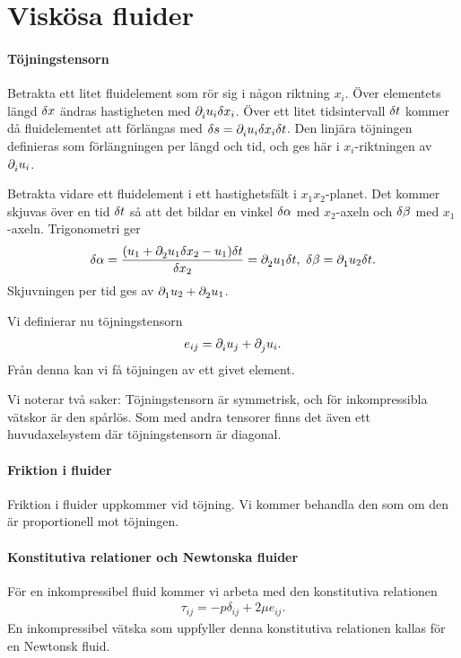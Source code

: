 \section{Viskösa fluider}

\paragraph{Töjningstensorn}
Betrakta ett litet fluidelement som rör sig i någon riktning $x_{i}$. Över elementets längd $\delta x$ ändras hastigheten med $\partial_{i}^{}u_{i}\delta x_{i}$. Över ett litet tidsintervall $\delta t$ kommer då fluidelementet att förlängas med $\delta s = \partial_{i}^{}u_{i}\delta x_{i}\delta t$. Den linjära töjningen definieras som förlängningen per längd och tid, och ges här i $x_{i}$-riktningen av $\partial_{i}^{}u_{i}$.

Betrakta vidare ett fluidelement i ett hastighetsfält i $x_{1}x_{2}$-planet. Det kommer skjuvas över en tid $\delta t$ så att det bildar en vinkel $\delta \alpha$ med $x_{2}$-axeln och $\delta \beta$ med $x_{1}$-axeln. Trigonometri ger
\begin{align*}
	\delta \alpha = \frac{(u_{1} + \partial_{2}^{}u_{1}\delta x_{2} - u_{1})\delta t}{\delta x_{2}} = \partial_{2}^{}u_{1}\delta t,\ \delta \beta = \partial_{1}^{}u_{2}\delta t.
\end{align*}
Skjuvningen per tid ges av $\partial_{1}^{}u_{2} + \partial_{2}^{}u_{1}$.

Vi definierar nu töjningstensorn
\begin{align*}
	e_{ij} = \partial_{i}^{}u_{j} + \partial_{j}^{}u_{i}.
\end{align*}
Från denna kan vi få töjningen av ett givet element.

Vi noterar två saker: Töjningstensorn är symmetrisk, och för inkompressibla vätskor är den spårlös. Som med andra tensorer finns det även ett huvudaxelsystem där töjningstensorn är diagonal.

\paragraph{Friktion i fluider}
Friktion i fluider uppkommer vid töjning. Vi kommer behandla den som om den är proportionell mot töjningen.

\paragraph{Konstitutiva relationer och Newtonska fluider}
För en inkompressibel fluid kommer vi arbeta med den konstitutiva relationen
\begin{align*}
	\tau_{ij} = -p\delta_{ij} + 2\mu e_{ij}.
\end{align*}
En inkompressibel vätska som uppfyller denna konstitutiva relationen kallas för en Newtonsk fluid.

